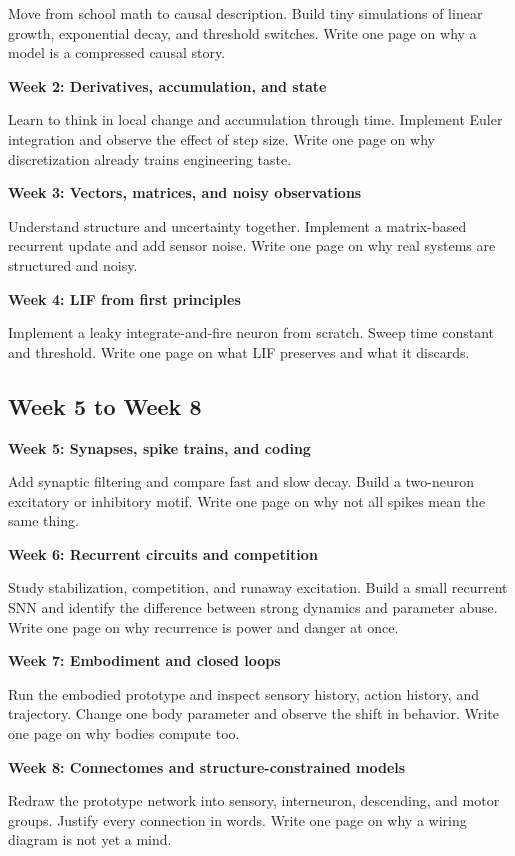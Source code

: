 \documentclass[11pt]{article}
\begin{document}
Move from school math to causal description. Build tiny simulations of linear growth, exponential decay, and threshold switches. Write one page on why a model is a compressed causal story.

\textbf{Week 2: Derivatives, accumulation, and state}

Learn to think in local change and accumulation through time. Implement Euler integration and observe the effect of step size. Write one page on why discretization already trains engineering taste.

\textbf{Week 3: Vectors, matrices, and noisy observations}

Understand structure and uncertainty together. Implement a matrix-based recurrent update and add sensor noise. Write one page on why real systems are structured and noisy.

\textbf{Week 4: LIF from first principles}

Implement a leaky integrate-and-fire neuron from scratch. Sweep time constant and threshold. Write one page on what LIF preserves and what it discards.

\subsection{Week 5 to Week 8}

\textbf{Week 5: Synapses, spike trains, and coding}

Add synaptic filtering and compare fast and slow decay. Build a two-neuron excitatory or inhibitory motif. Write one page on why not all spikes mean the same thing.

\textbf{Week 6: Recurrent circuits and competition}

Study stabilization, competition, and runaway excitation. Build a small recurrent SNN and identify the difference between strong dynamics and parameter abuse. Write one page on why recurrence is power and danger at once.

\textbf{Week 7: Embodiment and closed loops}

Run the embodied prototype and inspect sensory history, action history, and trajectory. Change one body parameter and observe the shift in behavior. Write one page on why bodies compute too.

\textbf{Week 8: Connectomes and structure-constrained models}

Redraw the prototype network into sensory, interneuron, descending, and motor groups. Justify every connection in words. Write one page on why a wiring diagram is not yet a mind.
\end{document}
